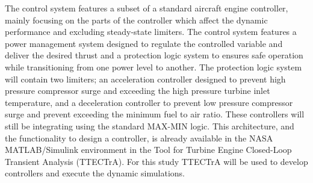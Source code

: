 
The control system features a subset of a standard aircraft engine controller\cite{Csank:2010}, mainly focusing on the parts of the controller which affect the dynamic performance and excluding steady-state limiters.  The control system features a power management system designed to regulate the controlled variable and deliver the desired thrust and a protection logic system to ensures safe operation while transitioning from one power level to another.  The protection logic system will contain two limiters; an acceleration controller designed to prevent high pressure compressor surge and exceeding the high pressure turbine inlet temperature, and a deceleration controller to prevent low pressure compressor surge and prevent exceeding the minimum fuel to air ratio.  These controllers will still be integrating using the standard MAX-MIN logic.  This architecture, and the functionality to design a controller, is already available in the NASA MATLAB/Simulink environment in the Tool for Turbine Engine Closed-Loop Transient Analysis \cite{Csank:2014} (TTECTrA). For this study TTECTrA will be used to develop controllers and execute the dynamic simulations.